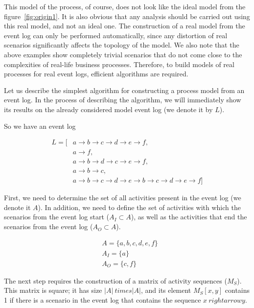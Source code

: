 \documentclass[
11pt,%
tightenlines,%
twoside,%
onecolumn,%
nofloats,%
nobibnotes,%
nofootinbib,%
superscriptaddress,%
noshowpacs,%
centertags]%
{revtex4}
\begin{document}
This model of the process, of course, does not look like the ideal model from the figure~\ref{fig:origin1}.
It is also obvious that any analysis should be carried out using this real model, and not an ideal one.
The construction of a real model from the event log can only be performed automatically, since any distortion of real scenarios significantly affects the topology of the model.
We also note that the above examples show completely trivial scenarios that do not come close to the complexities of real-life business processes.
Therefore, to build models of real processes for real event logs, efficient algorithms are required.

Let us describe the simplest algorithm for constructing a process model from an event log.
In the process of describing the algorithm, we will immediately show its results on the already considered model event log (we denote it by $L$).

So we have an event log

\begin{equation}
\begin{aligned}
L = [
&{a \rightarrow b \rightarrow c \rightarrow d \rightarrow e \rightarrow f},\\
&{a \rightarrow f},\\
&{a \rightarrow b \rightarrow d \rightarrow c \rightarrow e \rightarrow f},\\
&{a \rightarrow b \rightarrow c},\\
&{a \rightarrow b \rightarrow c \rightarrow d \rightarrow e \rightarrow b \rightarrow c \rightarrow d \rightarrow e \rightarrow f}
]
\end{aligned}
\end{equation}

First, we need to determine the set of all activities present in the event log (we denote it $A$).
In addition, we need to define the set of activities with which the scenarios from the event log start ($A_I \subset A$), as well as the activities that end the scenarios from the event log ($A_O \subset A$).

\begin{equation}
\begin{aligned}
&A = \{a, b, c, d, e, f\} \\
&A_I = \{a\} \\
&A_O = \{c, f\}
\end{aligned}
\end{equation}

The next step requires the construction of a matrix of activity sequences ($M_S$).
This matrix is square; it has size $| A | \ times | A |$, and its element $M_S[x, y]$ contains 1 if there is a scenario in the event log that contains the sequence $x \ rightarrow y$.
\end{document}
